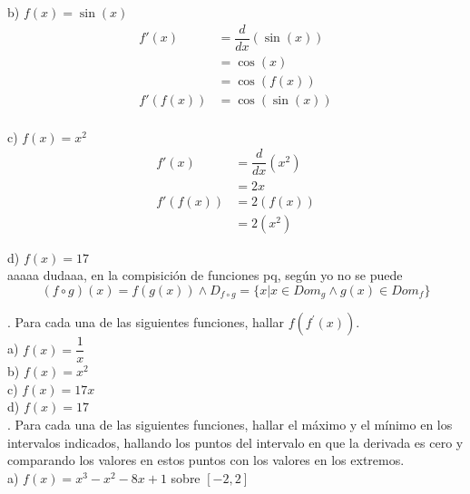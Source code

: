 \documentclass[letterpaper]{article}
\newcommand{\fp}[1]{#1^{\prime}}
\newcommand{\de}{\dfrac{d}{dx}}
\begin{document}
b) $ f(x) = \sin(x) $\\

\begin{align*}
	f'(x) &= \de (\sin(x))\\
	&= \cos(x)\\
	&= \cos(f(x))\\
	f'(f(x))&= \cos(\sin(x))\\
\end{align*}

c) $ f(x) = x^{2} $\\

\begin{align*}
	f'(x) &= \de \left( x^2 \right)\\
	&= 2x\\
	f'(f(x)) &= 2(f(x))\\
	&= 2(x^{2})
\end{align*}

d) $ f(x) = 17 $\\

aaaaa dudaaa, en la compisición de funciones pq, según yo no se puede
\[
(f \circ g) (x) = f(g(x)) \land D_{f\circ g} = \{ x | x \in Dom_g \land g(x) \in Dom_f \}
\]

. Para cada una de las siguientes funciones, hallar $ f(\fp{f} (x)) $.\\

a) $ f(x) = \dfrac{1}{x} $\\


b) $ f(x) = x^{2} $\\


c) $ f(x) = 17x $\\


d) $ f(x) = 17 $\\


. Para cada una de las siguientes funciones, hallar el máximo y el mínimo en los intervalos indicados, hallando los puntos del intervalo en que la derivada es cero y comparando los valores en estos puntos con los valores en los extremos.\\

a) $ f(x) = x^{3} -x^{2} -8x +1$ sobre $ [-2,2] $\\

\end{document}
